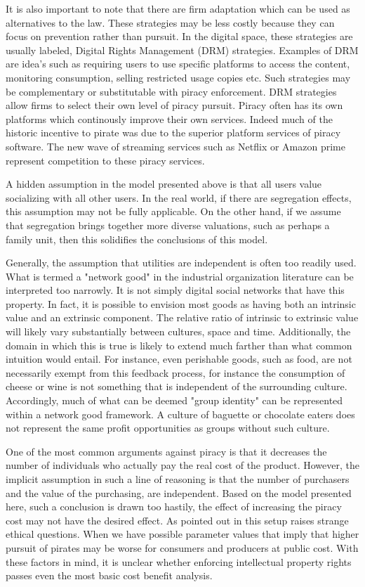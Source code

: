 It is also important to note that there are firm adaptation which can be used as alternatives to the law. These strategies may be less costly because they can focus on prevention rather than pursuit. In the digital space, these strategies are usually labeled, Digital Rights Management (DRM) strategies. Examples of DRM are idea's such as requiring users to use specific platforms to access the content, monitoring consumption, selling restricted usage copies etc. Such strategies may be complementary or substitutable with piracy enforcement. DRM strategies allow firms to select their own level of piracy pursuit. Piracy often has its own platforms which continously improve their own services. Indeed much of the historic incentive to pirate was due to the superior platform services of piracy software. The new wave of streaming services such as Netflix or Amazon prime represent competition to these piracy services.


A hidden assumption in the model presented above is that all users value socializing with all other users. In the real world, if there are segregation effects, this assumption may not be fully applicable. On the other hand, if we assume that segregation brings together more diverse valuations, such as perhaps a family unit, then this solidifies the conclusions of this model.

Generally, the assumption that utilities are independent is often too readily used. What is termed a "network good" in the industrial organization literature can be interpreted too narrowly. It is not simply digital social networks that have this property. In fact, it is possible to envision most goods as having both an intrinsic value and an extrinsic component. The relative ratio of intrinsic to extrinsic value will likely vary substantially between cultures, space and time. Additionally, the domain in which this is true is likely to extend much farther than what common intuition would entail. For instance, even perishable goods, such as food, are not necessarily exempt from this feedback process, for instance the consumption of cheese or wine is not something that is independent of the surrounding culture. Accordingly, much of what can be deemed "group identity" can be represented within a network good framework. A culture of baguette or chocolate eaters does not represent the same profit opportunities as groups without such culture.

One of the most common arguments against piracy is that it decreases the number of individuals who actually pay the real cost of the product.  However, the implicit assumption in such a line of reasoning is that the number of purchasers and the value of the purchasing, are independent. Based on the model presented here, such a conclusion is drawn too hastily, the effect of increasing the piracy cost may not have the desired effect. As pointed out in \cite{CRP91} this setup raises strange ethical questions. When we have possible parameter values that imply that higher pursuit of pirates may be worse for consumers and producers at public cost. With these factors in mind, it is unclear whether enforcing intellectual property rights passes even the most basic cost benefit analysis.

